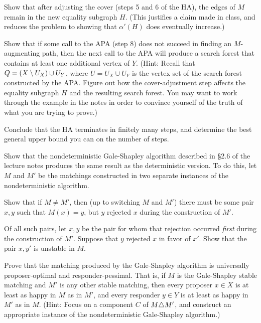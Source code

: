 \probpart Show that after adjusting the cover (steps 5 and 6 of the HA), the edges of $M$ remain in the new equality subgraph $H$.  (This justifies a claim made in class, and reduces the problem to showing that $\alpha'(H)$ does eventually increase.)

\probpart Show that if some call to the APA (step 8) does not succeed in finding an $M$-augmenting path, then the next call to the APA will produce a search forest that contains at least one additional vertex of $Y$.  (Hint: Recall that $Q=(X\setminus U_X)\cup U_Y$, where $U=U_X\cup U_Y$ is the vertex set of the search forest constructed by the APA.  Figure out how the cover-adjustment step affects the equality subgraph $H$ and the resulting search forest.  You may want to work through the example in the notes in order to convince yourself of the truth of what you are trying to prove.)

\probpart Conclude that the HA terminates in finitely many steps, and determine the best general upper bound you can on the number of steps.

\prob Show that the nondeterministic Gale-Shapley algorithm described in \S2.6 of the lecture notes produces the same result as the deterministic version.  To do this, let $M$ and $M'$ be the matchings constructed in two separate instances of the nondeterministic algorithm.

\probpart Show that if $M\neq M'$, then (up to switching $M$ and $M'$) there must be some pair $x,y$ such that $M(x)=y$, but $y$ rejected $x$ during the construction of $M'$.

\probpart Of all such pairs, let $x,y$ be the pair for whom that rejection occurred \emph{first} during the construction of $M'$.  Suppose that $y$ rejected $x$ in favor of $x'$.  Show that the pair $x,y'$ is unstable in $M$.

 Prove that the matching produced by the Gale-Shapley algorithm is universally proposer-optimal and responder-pessimal.  That is, if $M$ is the Gale-Shapley stable matching and $M'$ is any other stable matching, then every proposer $x\in X$ is at least as happy in $M$ as in $M'$, and every responder $y\in Y$ is at least as happy in $M'$ as in $M$.  (Hint: Focus on a component $C$ of $M\triangle M'$, and construct an appropriate instance of the nondeterministic Gale-Shapley algorithm.)

